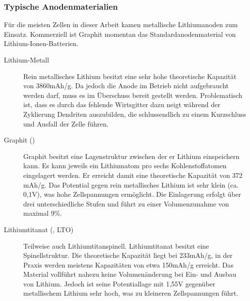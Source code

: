 \documentclass[a4paper, 11pt, headsepline,footsepline,twoside,abstract]{scrbook}
\begin{document}
\subsubsection{Typische Anodenmaterialien}
Für die meisten Zellen in dieser Arbeit kamen metallische Lithiumanoden zum Einsatz. Kommerziell ist Graphit momentan das Standardanodenmaterial von Lithium-Ionen-Batterien.
\begin{description}
\item[Lithium-Metall] Rein metallisches Lithium besitzt eine sehr hohe theoretische Kapazität von 3860mAh/g. Da jedoch die Anode im Betrieb nicht aufgebraucht werden darf, muss es im Überschuss bereit gestellt werden. Problematisch ist, dass es durch das fehlende Wirtsgitter dazu neigt während der Zyklierung Dendriten auszubilden, die schlussendlich zu einem Kurzschluss und Ausfall der Zelle führen.
\item[Graphit ()] Graphit besitzt eine Lagenstruktur zwischen der er Lithium einspeichern kann. Es kann jeweils ein Lithiumatom pro sechs Kohlenstoffatomen eingelagert werden. Er erreicht damit eine theoretische Kapazität von 372 mAh/g. Das Potential gegen rein metallisches Lithium ist sehr klein (ca. 0,1V), was hohe Zellspannungen ermöglicht. Die Einlagerung erfolgt über drei unterschiedliche Stufen und führt zu einer Volumenzunahme von maximal 9\%.
\item[Lithiumtitanat (, LTO)] Teilweise auch Lithiumtitanspinell. Lithiumtitanat besitzt eine Spinellstruktur. Die theoretische Kapazität liegt bei 233mAh/g, in der Praxis werden meistens Kapazitäten von etwa 150mAh/g erreicht. Das Material vollführt nahezu keine Volumenänderung bei Ein- und Ausbau von Lithium. Jedoch ist seine Potentiallage mit 1,55V gegenüber metallischem Lithium sehr hoch, was zu kleineren Zellspannungen führt.
\end{description}
\end{document}
